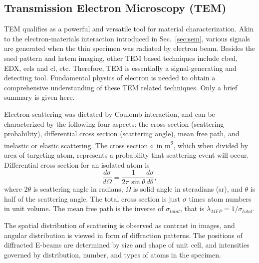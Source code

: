 \subsection{Transmission Electron Microscopy (TEM)}

TEM qualifies as a powerful and versatile tool for material characterization. Akin to the electron-materials interaction introduced in Sec.~\ref{sec:sem}, various signals are generated when the thin specimen was radiated by electron beam. Besides the \gls{saed} pattern and \gls{hrtem} imaging, other TEM based techniques include \gls{cbed}, EDX, \gls{eels} and \gls{cl}, etc. Therefore, TEM is essentially a signal-generating and detecting tool.\cite{Williams2009} Fundamental physics of electron is needed to obtain a comprehensive understanding of these TEM related techniques. Only a brief summary is given here.

Electron scattering was dictated by Coulomb interaction, and can be characterized by the following four aspects: the cross section (scattering probability), differential cross section (scattering angle), mean free path, and inelastic or elastic scattering. The cross section $\sigma$ in \si{m^2}, which when divided by area of targeting atom, represents a probability that scattering event will occur. Differential cross section for an isolated atom is 
\[
\frac{d\sigma}{d\Omega} = \frac{1}{2\pi \sin\theta} \frac{d\sigma}{d\theta},
\] 
where $2\theta$ is scattering angle in radians, $\Omega$ is solid angle in steradians (sr), and $\theta$ is half of the scattering angle. The total cross section is just $\sigma$ times atom numbers in unit volume. The mean free path is the inverse of $\sigma_{total}$, that is $\lambda_{MFP} = 1/\sigma_{total}$. 

The spatial distribution of scattering is observed as contrast in images, and angular distribution is viewed in form of diffraction patterns. The positions of diffracted E-beams are determined by size and shape of unit cell, and intensities governed by distribution, number, and types of atoms in the specimen. 

